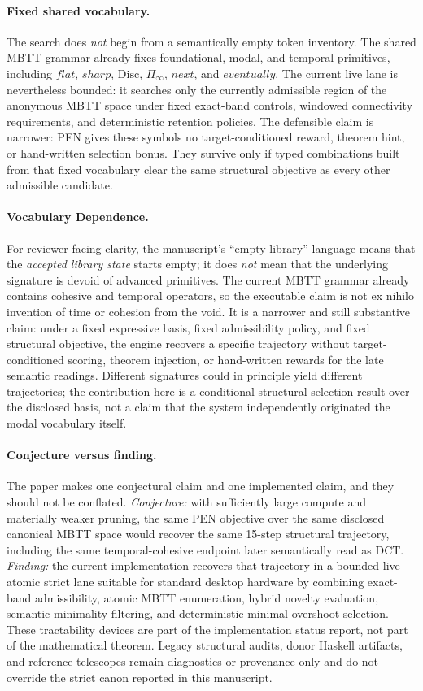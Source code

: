 \documentclass[11pt,a4paper]{article}
\def\flat{flat}%
\def\sharp{sharp}%
\def\bigcirc{next}%
\def\Diamond{eventually}%
\theoremstyle{plain}
\theoremstyle{definition}
\theoremstyle{remark}
\newcommand{\Disc}{\mathrm{Disc}}
\begin{document}
\paragraph{Fixed shared vocabulary.}
The search does \emph{not} begin from a semantically empty token inventory.
The shared MBTT grammar already fixes foundational, modal, and temporal primitives, including $\flat$, $\sharp$, $\Disc$, $\Pi_{\!\infty}$, $\bigcirc$, and $\Diamond$.
The current live lane is nevertheless bounded: it searches only the currently admissible region of the anonymous MBTT space under fixed exact-band controls, windowed connectivity requirements, and deterministic retention policies.
The defensible claim is narrower: PEN gives these symbols no target-conditioned reward, theorem hint, or hand-written selection bonus.
They survive only if typed combinations built from that fixed vocabulary clear the same structural objective as every other admissible candidate.

\paragraph{Vocabulary Dependence.}
For reviewer-facing clarity, the manuscript's ``empty library'' language means that the \emph{accepted library state} starts empty; it does \emph{not} mean that the underlying signature is devoid of advanced primitives.
The current MBTT grammar already contains cohesive and temporal operators, so the executable claim is not ex nihilo invention of time or cohesion from the void.
It is a narrower and still substantive claim: under a fixed expressive basis, fixed admissibility policy, and fixed structural objective, the engine recovers a specific trajectory without target-conditioned scoring, theorem injection, or hand-written rewards for the late semantic readings.
Different signatures could in principle yield different trajectories; the contribution here is a conditional structural-selection result over the disclosed basis, not a claim that the system independently originated the modal vocabulary itself.

\paragraph{Conjecture versus finding.}
The paper makes one conjectural claim and one implemented claim, and they should not be conflated.
\emph{Conjecture:} with sufficiently large compute and materially weaker pruning, the same PEN objective over the same disclosed canonical MBTT space would recover the same 15-step structural trajectory, including the same temporal-cohesive endpoint later semantically read as DCT.
\emph{Finding:} the current implementation recovers that trajectory in a bounded live atomic strict lane suitable for standard desktop hardware by combining exact-band admissibility, atomic MBTT enumeration, hybrid novelty evaluation, semantic minimality filtering, and deterministic minimal-overshoot selection.
These tractability devices are part of the implementation status report, not part of the mathematical theorem.
Legacy structural audits, donor Haskell artifacts, and reference telescopes remain diagnostics or provenance only and do not override the strict canon reported in this manuscript.
\end{document}
